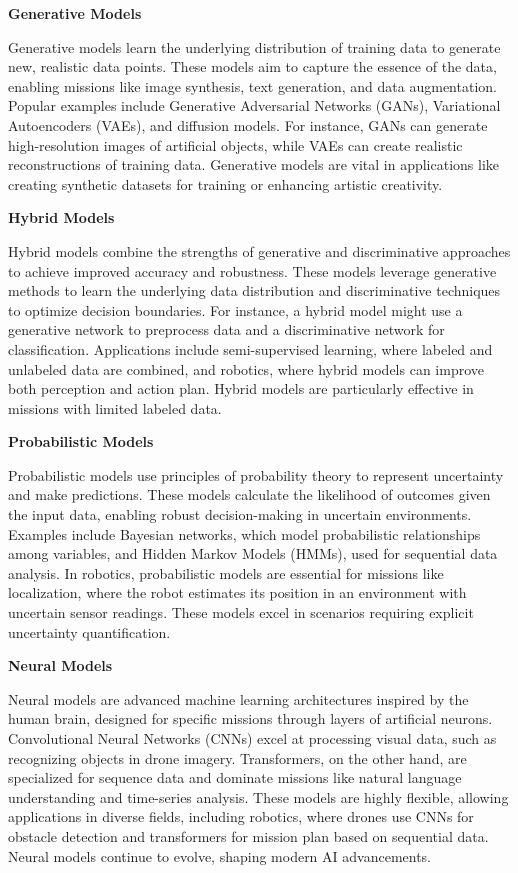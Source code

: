 \documentclass{book}
\providecommand{\ProjectDeepHeading}[2]{%
    \par\medskip\noindent\textbf{#2}\par\smallskip
}
\begin{document}
\ProjectDeepHeading{4}{Generative Models}
Generative models learn the underlying distribution of training data to generate new, realistic data points. These models aim to capture the essence of the data, enabling missions like image synthesis, text generation, and data augmentation. Popular examples include Generative Adversarial Networks (GANs), Variational Autoencoders (VAEs), and diffusion models. For instance, GANs can generate high-resolution images of artificial objects, while VAEs can create realistic reconstructions of training data. Generative models are vital in applications like creating synthetic datasets for training or enhancing artistic creativity.



\ProjectDeepHeading{4}{Hybrid Models}
Hybrid models combine the strengths of generative and discriminative approaches to achieve improved accuracy and robustness. These models leverage generative methods to learn the underlying data distribution and discriminative techniques to optimize decision boundaries. For instance, a hybrid model might use a generative network to preprocess data and a discriminative network for classification. Applications include semi-supervised learning, where labeled and unlabeled data are combined, and robotics, where hybrid models can improve both perception and action plan. Hybrid models are particularly effective in missions with limited labeled data.

\ProjectDeepHeading{4}{Probabilistic Models}
Probabilistic models use principles of probability theory to represent uncertainty and make predictions. These models calculate the likelihood of outcomes given the input data, enabling robust decision-making in uncertain environments. Examples include Bayesian networks, which model probabilistic relationships among variables, and Hidden Markov Models (HMMs), used for sequential data analysis. In robotics, probabilistic models are essential for missions like localization, where the robot estimates its position in an environment with uncertain sensor readings. These models excel in scenarios requiring explicit uncertainty quantification.

\ProjectDeepHeading{4}{Neural Models}
Neural models are advanced machine learning architectures inspired by the human brain, designed for specific missions through layers of artificial neurons. Convolutional Neural Networks (CNNs) excel at processing visual data, such as recognizing objects in drone imagery. Transformers, on the other hand, are specialized for sequence data and dominate missions like natural language understanding and time-series analysis. These models are highly flexible, allowing applications in diverse fields, including robotics, where drones use CNNs for obstacle detection and transformers for mission plan based on sequential data. Neural models continue to evolve, shaping modern AI advancements.
\end{document}
